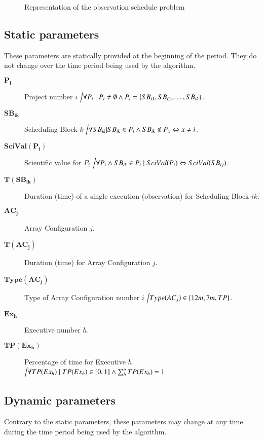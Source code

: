 \begin{figure}
\def\svgwidth{\textwidth}

\caption{Representation of the observation schedule problem}
\label{fig:obs-schedule-representation}
\end{figure}

\subsection{Static parameters}
These parameters are statically provided at the beginning of the period. They do not change over the time period being used by the algorithm.

\begin{description}
\item[$\mathbf{P_i}$] Project number $i$ $\Big\slash \forall P_i \mid P_i \neq \emptyset \land P_i = \{SB_{i1}, SB_{i2}, \ldots, SB_{ik}\}$.

\item[$\mathbf{SB_{ik}}$] Scheduling Block $k$ $\Big\slash \forall SB_{ik} | SB_{ik} \in P_i \land SB_{ik} \notin P_x \Leftrightarrow x \neq i$.

\item[$\mathbf{SciVal(P_i)}$] Scientific value for $P_i$ $\Big\slash \forall P_i \land SB_{ik} \in P_i \mid SciVal(P_i) \Leftrightarrow SciVal(SB_{ij}) $.

\item[$\mathbf{T(SB_{ik})}$] Duration (time) of a single execution (observation) for Scheduling Block $ik$.

\item[$\mathbf{AC_j}$] Array Configuration $j$.

\item[$\mathbf{T(AC_j)}$] Duration (time) for Array Configuration $j$.

\item[$\mathbf{Type(AC_j)}$] Type of Array Configuration number $i$ $\Big\slash Type(AC_j) \in \{12m, 7m, TP\}$.

\item[$\mathbf{Ex_h}$] Executive number $h$.

\item[$\mathbf{TP(Ex_h)}$] Percentage of time for Executive $h$ $\Big\slash \forall TP(Ex_h) \mid TP(Ex_h) \in {[0,1]} \land \sum_{h}^{n} TP(Ex_h) = 1$ 

\end{description} 

\subsection{Dynamic parameters}
Contrary to the static parameters, these parameters may change at any time during the time period being used by the algorithm.

